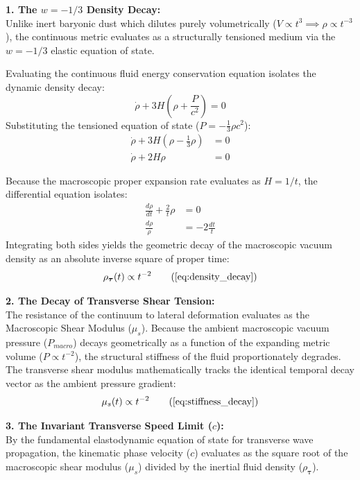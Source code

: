 \documentclass[11pt, a4paper]{article}
\begin{document}
\textbf{1. The $w = -1/3$ Density Decay:} \\
Unlike inert baryonic dust which dilutes purely volumetrically ($V \propto t^3 \implies \rho \propto t^{-3}$), the continuous metric evaluates as a structurally tensioned medium via the $w = -1/3$ elastic equation of state. 

Evaluating the continuous fluid energy conservation equation isolates the dynamic density decay:
\begin{equation}
    \dot{\rho} + 3H\left(\rho + \frac{P}{c^2}\right) = 0 
\end{equation}
Substituting the tensioned equation of state ($P = -\frac{1}{3}\rho c^2$):
\begin{align}
    \dot{\rho} + 3H\left(\rho - \frac{1}{3}\rho\right) &= 0  \\
    \dot{\rho} + 2H\rho &= 0 
\end{align}

Because the macroscopic proper expansion rate evaluates as $H = 1/t$, the differential equation isolates:
\begin{align}
    \frac{d\rho}{dt} + \frac{2}{t}\rho &= 0  \\
    \frac{d\rho}{\rho} &= -2 \frac{dt}{t} 
\end{align}
Integrating both sides yields the geometric decay of the macroscopic vacuum density as an absolute inverse square of proper time:
\begin{equation}
    \rho_{\boldsymbol{\tau}}(t) \propto t^{-2} \tag{\ref{eq:density_decay}}
\end{equation}

\textbf{2. The Decay of Transverse Shear Tension:} \\
The resistance of the continuum to lateral deformation evaluates as the Macroscopic Shear Modulus ($\mu_s$). Because the ambient macroscopic vacuum pressure ($P_{macro}$) decays geometrically as a function of the expanding metric volume ($P \propto t^{-2}$), the structural stiffness of the fluid proportionately degrades. The transverse shear modulus mathematically tracks the identical temporal decay vector as the ambient pressure gradient:
\begin{equation}
    \mu_s(t) \propto t^{-2} \tag{\ref{eq:stiffness_decay}}
\end{equation}

\textbf{3. The Invariant Transverse Speed Limit ($c$):} \\
By the fundamental elastodynamic equation of state for transverse wave propagation, the kinematic phase velocity ($c$) evaluates as the square root of the macroscopic shear modulus ($\mu_s$) divided by the inertial fluid density ($\rho_{\boldsymbol{\tau}}$). 
\end{document}
